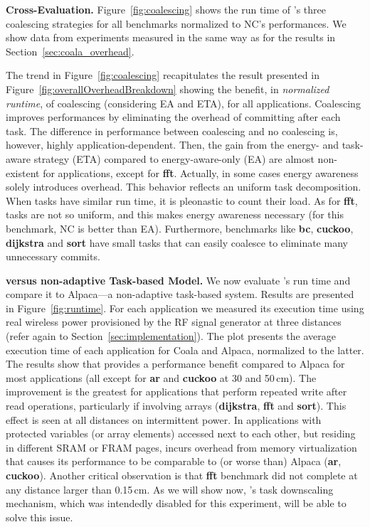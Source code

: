 \textbf{\sys Cross-Evaluation.} Figure~\ref{fig:coalescing} shows the run time of \sys's three coalescing strategies for all benchmarks normalized to NC's performances. We show data from experiments measured in the same way as for the results in Section~\ref{sec:coala_overhead}. 

The trend in Figure~\ref{fig:coalescing} recapitulates the result presented in Figure~\ref{fig:overallOverheadBreakdown} showing the benefit, in \emph {normalized runtime}, of coalescing (considering EA and ETA), for all applications. Coalescing improves performances by eliminating the overhead of committing after each task. The difference in performance between coalescing and no coalescing is, however, highly application-dependent. Then, the gain from the energy- and task-aware strategy (ETA) compared to energy-aware-only (EA) are almost non-existent for applications, except for \textbf{fft}. Actually, in some cases energy awareness solely introduces overhead. This behavior reflects an uniform task decomposition. When tasks have similar run time, it is pleonastic to count their load. As for \textbf{fft}, tasks are not so uniform, and this makes energy awareness necessary (for this benchmark, NC is better than EA).
Furthermore, benchmarks like \textbf{bc}, \textbf{cuckoo}, \textbf{dijkstra} and \textbf{sort} have small tasks that \sys can easily coalesce to eliminate many unnecessary commits.

\textbf{\sys versus non-adaptive Task-based Model.} We now evaluate \sys's run time and compare it to Alpaca---a non-adaptive task-based system. Results are presented in Figure~\ref{fig:runtime}. For each application we measured its execution time using real wireless power provisioned by the RF signal generator at three distances (refer again to Section~\ref{sec:implementation}). The plot presents the average execution time of each application for Coala and Alpaca, normalized to the latter. The results show that \sys provides a performance benefit compared to Alpaca for most applications (all except for \textbf{ar} and \textbf{cuckoo} at 30 and 50\,cm). The improvement is the greatest for applications that perform repeated write after read operations, particularly if involving arrays (\textbf{dijkstra}, \textbf{fft} and \textbf{sort}). This effect is seen at all distances on intermittent power. In applications with protected variables (or array elements) accessed next to each other, but residing in different SRAM or FRAM pages, \sys incurs overhead from memory virtualization that causes its performance to be comparable to (or worse than) Alpaca (\textbf{ar}, \textbf{cuckoo}).
%
Another critical observation is that \textbf{fft} benchmark did not complete at any distance larger than 0.15\,cm. As we will show now, \sys's task downscaling mechanism, which was intendedly disabled for this experiment, will be able to solve this issue.

